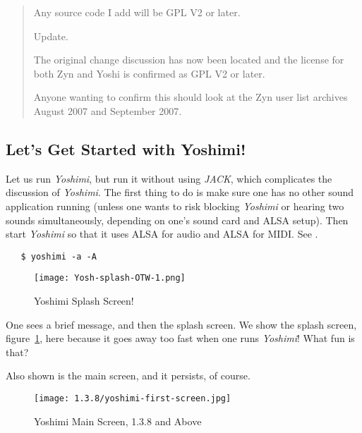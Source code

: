 \documentclass[
 11pt,
 twoside,
 a4paper,
 final                                 %
]{article}
\begin{document}
\begin{quotation}
      Any source code I add will be GPL V2 or later.

      Update.

      The original change discussion has now been located and the license for
      both Zyn and Yoshi is confirmed as GPL V2 or later.

      Anyone wanting to confirm this should look at the Zyn user list archives
      August 2007 and September 2007.
   \end{quotation}

\subsection{Let's Get Started with Yoshimi!}
\label{subsec:introduction_lets_get_started}

   Let us run \textsl{Yoshimi}, but run it without using \textsl{JACK}, which
   complicates the discussion of \textsl{Yoshimi}.  The first
   thing to do is make sure one has no other sound application running
   (unless one wants to risk blocking \textsl{Yoshimi} or hearing two sounds
   simultaneously, depending on one's sound card and ALSA setup).
   Then start \textsl{Yoshimi} so that it uses ALSA for audio and ALSA for
   MIDI.  See .

\begin{verbatim}
   $ yoshimi -a -A
\end{verbatim}

\begin{figure}[H]
   \centering 
   \texttt{[image: Yosh-splash-OTW-1.png]}
   \caption{Yoshimi Splash Screen!}
   \label{fig:yoshimi_splash_screen}
\end{figure}

   One sees a brief message, and then the splash screen.
   We show the splash screen, figure~\ref{fig:yoshimi_splash_screen},
   here because it goes away too fast when one runs \textsl{Yoshimi}!
   What fun is that?

   Also shown is the main screen, and it persists, of course.

\begin{figure}[H]
   \centering 
   \texttt{[image: 1.3.8/yoshimi-first-screen.jpg]}
   \caption{Yoshimi Main Screen, 1.3.8 and Above}
   \label{fig:yoshimi_main_screen}
\end{figure}

   
\end{document}
